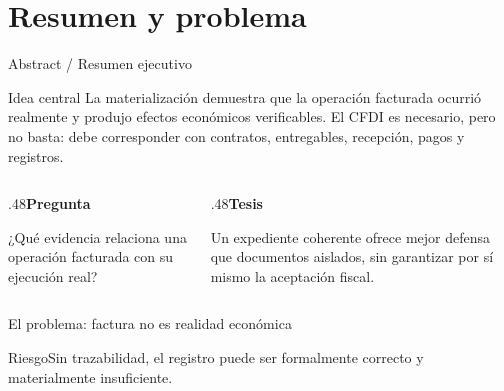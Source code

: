 \documentclass[spanish,aspectratio=169,xcolor={dvipsnames,table}]{beamer}
\begin{document}
\section{Resumen y problema}
\begin{frame}{Abstract / Resumen ejecutivo}
  \begin{block}{Idea central}
    La materialización demuestra que la operación facturada ocurrió realmente y produjo efectos económicos verificables. El CFDI es necesario, pero no basta: debe corresponder con contratos, entregables, recepción, pagos y registros.
  \end{block}
  \begin{columns}[T]
    \begin{column}{.48\textwidth}\textbf{Pregunta}\par\smallskip ¿Qué evidencia relaciona una operación facturada con su ejecución real?\end{column}
    \begin{column}{.48\textwidth}\textbf{Tesis}\par\smallskip Un expediente coherente ofrece mejor defensa que documentos aislados, sin garantizar por sí mismo la aceptación fiscal.\end{column}
  \end{columns}
\end{frame}

\begin{frame}{El problema: factura no es realidad económica}
  \begin{center}
  \end{center}
  \vfill
  \begin{alertblock}{Riesgo}\centering Sin trazabilidad, el registro puede ser formalmente correcto y materialmente insuficiente.\end{alertblock}
\end{frame}
\end{document}
